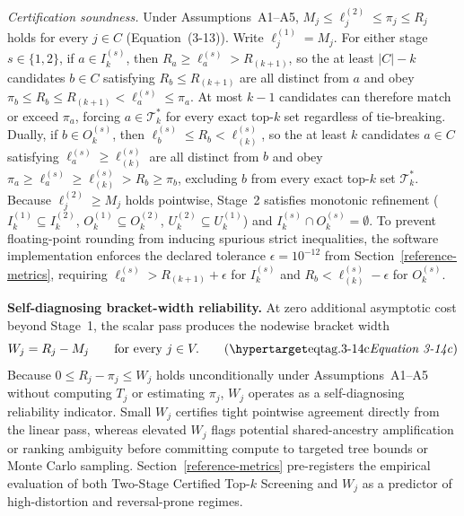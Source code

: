 \textit{Certification soundness.}
Under Assumptions~A1--A5, $M_j\le\ell_j^{(2)}\le\pi_j\le R_j$ holds for
every $j\in C$ (Equation~(3-13)). Write $\ell_j^{(1)}=M_j$. For either stage
$s\in\{1,2\}$, if $a\in I_k^{(s)}$, then $R_a\ge\ell_a^{(s)}>R_{(k+1)}$, so
the at least $|C|-k$ candidates $b\in C$ satisfying $R_b\le R_{(k+1)}$ are
all distinct from $a$ and obey
$\pi_b\le R_b\le R_{(k+1)}<\ell_a^{(s)}\le\pi_a$. At most $k-1$ candidates
can therefore match or exceed $\pi_a$, forcing $a\in\mathcal{T}_k^*$ for
every exact top-$k$ set regardless of tie-breaking. Dually, if
$b\in O_k^{(s)}$, then $\ell_b^{(s)}\le R_b<\ell_{(k)}^{(s)}$, so the at
least $k$ candidates $a\in C$ satisfying $\ell_a^{(s)}\ge\ell_{(k)}^{(s)}$
are all distinct from $b$ and obey
$\pi_a\ge\ell_a^{(s)}\ge\ell_{(k)}^{(s)}>R_b\ge\pi_b$, excluding $b$ from
every exact top-$k$ set $\mathcal{T}_k^*$. Because
$\ell_j^{(2)}\ge M_j$ holds pointwise, Stage~2 satisfies monotonic
refinement ($I_k^{(1)}\subseteq I_k^{(2)}$, $O_k^{(1)}\subseteq O_k^{(2)}$,
$U_k^{(2)}\subseteq U_k^{(1)}$) and $I_k^{(s)}\cap O_k^{(s)}=\emptyset$. To
prevent floating-point rounding from inducing spurious strict inequalities,
the software implementation enforces the declared tolerance
$\epsilon=10^{-12}$ from Section~\ref{reference-metrics}, requiring
$\ell_a^{(s)}>R_{(k+1)}+\epsilon$ for $I_k^{(s)}$ and
$R_b<\ell_{(k)}^{(s)}-\epsilon$ for $O_k^{(s)}$.

\textbf{Self-diagnosing bracket-width reliability.}
At zero additional asymptotic cost beyond Stage~1, the scalar pass produces
the nodewise bracket width
\[
W_j = R_j - M_j \qquad\text{for every }j\in V.
\eqtag[Zero-cost scalar bracket-width reliability indicator]{3-14c}
\]
Because $0\le R_j-\pi_j\le W_j$ holds unconditionally under
Assumptions~A1--A5 without computing $T_j$ or estimating $\pi_j$, $W_j$
operates as a self-diagnosing reliability indicator. Small $W_j$ certifies
tight pointwise agreement directly from the linear pass, whereas elevated
$W_j$ flags potential shared-ancestry amplification or ranking ambiguity
before committing compute to targeted tree bounds or Monte Carlo sampling.
Section~\ref{reference-metrics} pre-registers the empirical evaluation of
both Two-Stage Certified Top-$k$ Screening and $W_j$ as a predictor of
high-distortion and reversal-prone regimes.
